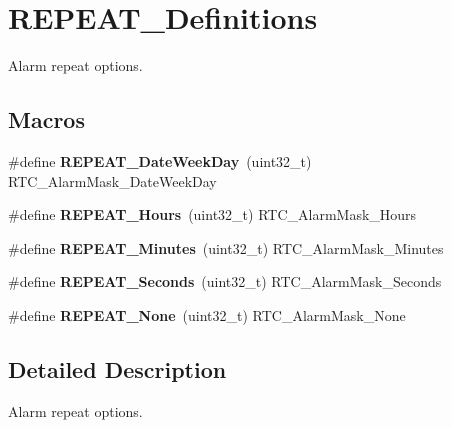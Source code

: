 \hypertarget{group___r_e_p_e_a_t___definitions}{}\section{R\+E\+P\+E\+A\+T\+\_\+\+Definitions}
\label{group___r_e_p_e_a_t___definitions}


Alarm repeat options.  


\subsection*{Macros}
\begin{DoxyCompactItemize}
\item 
\mbox{\label{group___r_e_p_e_a_t___definitions_ga9f2fcc8488db26c77b5ffd8f6c10c5d0}} 
\#define {\bfseries R\+E\+P\+E\+A\+T\+\_\+\+Date\+Week\+Day}~(uint32\+\_\+t) R\+T\+C\+\_\+\+Alarm\+Mask\+\_\+\+Date\+Week\+Day
\item 
\mbox{\label{group___r_e_p_e_a_t___definitions_gaa31a39c1b2a1d619db0901cc7c8d4592}} 
\#define {\bfseries R\+E\+P\+E\+A\+T\+\_\+\+Hours}~(uint32\+\_\+t) R\+T\+C\+\_\+\+Alarm\+Mask\+\_\+\+Hours
\item 
\mbox{\label{group___r_e_p_e_a_t___definitions_gac80fc7d65b83128ca58e210922020d37}} 
\#define {\bfseries R\+E\+P\+E\+A\+T\+\_\+\+Minutes}~(uint32\+\_\+t) R\+T\+C\+\_\+\+Alarm\+Mask\+\_\+\+Minutes
\item 
\mbox{\label{group___r_e_p_e_a_t___definitions_ga12d07c13f393b5b12efad9cd892de472}} 
\#define {\bfseries R\+E\+P\+E\+A\+T\+\_\+\+Seconds}~(uint32\+\_\+t) R\+T\+C\+\_\+\+Alarm\+Mask\+\_\+\+Seconds
\item 
\mbox{\label{group___r_e_p_e_a_t___definitions_ga473d162f72a4680e7e14043dfaf092c0}} 
\#define {\bfseries R\+E\+P\+E\+A\+T\+\_\+\+None}~(uint32\+\_\+t) R\+T\+C\+\_\+\+Alarm\+Mask\+\_\+\+None
\end{DoxyCompactItemize}


\subsection{Detailed Description}
Alarm repeat options. 

